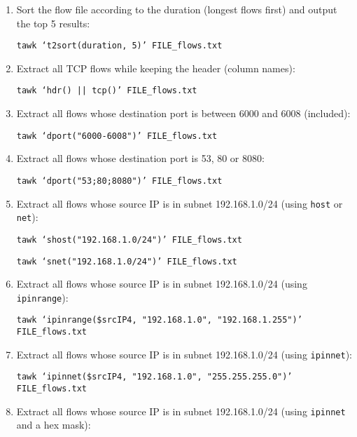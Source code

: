 \documentclass[documentation]{subfiles}
\begin{document}
\begin{enumerate}
            \begin{center}{\tt tawk `aggr(tuple2(), \$numBytesSnt "\textbackslash{}t" "Flows", 10)' FILE\_flows.txt}\end{center}
    \item Sort the flow file according to the duration (longest flows first) and output the top 5 results:
        \begin{center}{\tt tawk `t2sort(duration, 5)' FILE\_flows.txt}\end{center}
    \item Extract all TCP flows while keeping the header (column names):
        \begin{center}{\tt tawk `hdr() || tcp()' FILE\_flows.txt}\end{center}
    \item Extract all flows whose destination port is between 6000 and 6008 (included):
        \begin{center}{\tt tawk `dport("6000-6008")' FILE\_flows.txt}\end{center}
    \item Extract all flows whose destination port is 53, 80 or 8080:
        \begin{center}{\tt tawk `dport("53;80;8080")' FILE\_flows.txt}\end{center}
    \item Extract all flows whose source IP is in subnet 192.168.1.0/24 (using {\tt host} or {\tt net}):
        \begin{center}{\tt tawk `shost("192.168.1.0/24")' FILE\_flows.txt}\end{center}
        \begin{center}{\tt tawk `snet("192.168.1.0/24")' FILE\_flows.txt}\end{center}
    \item Extract all flows whose source IP is in subnet 192.168.1.0/24 (using {\tt ipinrange}):
        \begin{center}{\tt tawk `ipinrange(\$srcIP4, "192.168.1.0", "192.168.1.255")' FILE\_flows.txt}\end{center}
    \item Extract all flows whose source IP is in subnet 192.168.1.0/24 (using {\tt ipinnet}):
        \begin{center}{\tt tawk `ipinnet(\$srcIP4, "192.168.1.0", "255.255.255.0")' FILE\_flows.txt}\end{center}
    \item Extract all flows whose source IP is in subnet 192.168.1.0/24 (using {\tt ipinnet} and a hex mask):

\end{enumerate}
\end{document}
